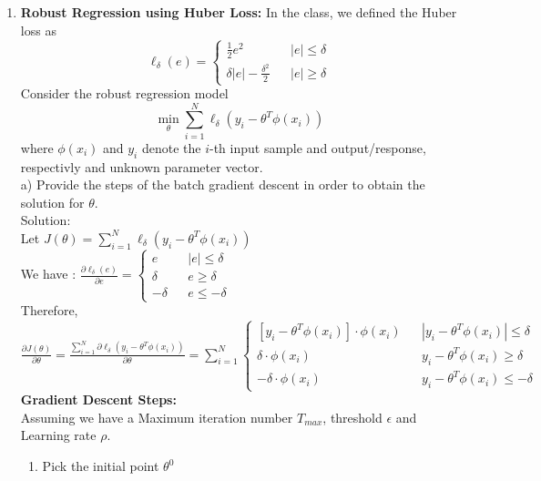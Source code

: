\documentclass[12pt]{article}
\newcommand{\solu}{{\color{blue} Solution:}}
\begin{document}
\begin{enumerate}
        \item \textbf{Robust Regression using Huber Loss:} In the class, we defined the Huber loss as 
        $$\ell_\delta(e) = \left\{
            \begin{array}{rcl}
            \frac{1}{2}e^2 & & |e| \le \delta \\
            \delta |e| - \frac{{\delta}^2}{2} & & |e| \ge \delta
        \end{array} 
        \right.$$
        Consider the robust regression model
        $$\min_\theta \sum_{i = 1}^{N}\ell_\delta(y_i - \theta^T\phi(x_i))$$
        where $\phi(x_i)$ and $y_i$ denote the $i$-th input sample and output/response, respectivly and unknown parameter vector.\\
        a) Provide the steps of the batch gradient descent in order to obtain the solution for $\theta$.\\
        \solu \\
        Let $J(\theta) = \sum_{i = 1}^{N}\ell_\delta(y_i - \theta^T\phi(x_i))$\\
        We have : $\frac{\partial \ell_\delta(e)}{\partial e} = \left\{
            \begin{array}{rcl}
            e & & |e| \le \delta \\
            \delta & & e \ge \delta \\
            -\delta & & e \le -\delta
        \end{array} 
        \right.$\\
        Therefore,
        $\frac{\partial J(\theta)}{\partial \theta} = \frac{\sum_{i = 1}^{N}\partial \ell_\delta(y_i - \theta^T\phi(x_i))}{\partial \theta} = \sum_{i = 1}^{N}\left\{ 
            \begin{array}{rcl}
                [y_i-\theta^T\phi(x_i)] \cdot \phi(x_i)  & & |y_i-\theta^T\phi(x_i)| \le \delta \\
                \delta\cdot \phi(x_i) & & y_i-\theta^T\phi(x_i) \ge \delta \\
                -\delta\cdot \phi(x_i) & & y_i-\theta^T\phi(x_i) \le -\delta
            \end{array} 
        \right.$\\
        \textbf{Gradient Descent Steps:}\\
        Assuming we have a Maximum iteration number $T_{max}$, threshold $\epsilon$ and Learning rate $\rho$.
        \begin{enumerate}[label=(\roman*)]
            \item Pick the initial point $\theta^0$

\end{enumerate}
\end{enumerate}
\end{document}
